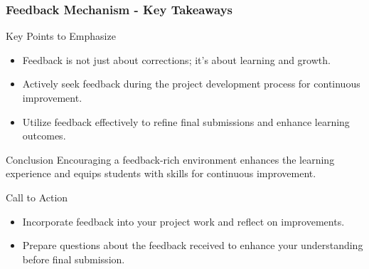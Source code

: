 \documentclass[aspectratio=169]{beamer}
\begin{document}
\begin{frame}[fragile]
    \frametitle{Feedback Mechanism - Key Takeaways}
    \begin{block}{Key Points to Emphasize}
        \begin{itemize}
            \item Feedback is not just about corrections; it’s about learning and growth.
            \item Actively seek feedback during the project development process for continuous improvement.
            \item Utilize feedback effectively to refine final submissions and enhance learning outcomes.
        \end{itemize}
    \end{block}
    
    \begin{block}{Conclusion}
        Encouraging a feedback-rich environment enhances the learning experience and equips students with skills for continuous improvement.
    \end{block}
    
    \begin{block}{Call to Action}
        \begin{itemize}
            \item Incorporate feedback into your project work and reflect on improvements.
            \item Prepare questions about the feedback received to enhance your understanding before final submission.
        \end{itemize}
    \end{block}
\end{frame}
\end{document}
